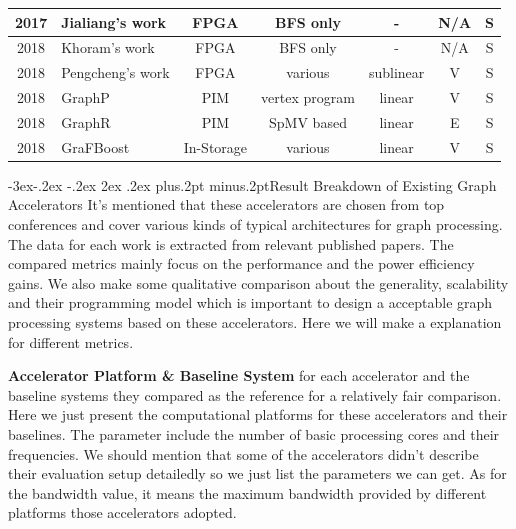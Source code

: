 \documentclass[twoside]{article}
\makeatletter
\def\subsection{\@startsection{subsection}{2}{\z@}%
 {-3ex\@plus -.2ex \@minus -.2ex}%
 {2ex \@plus.2ex}%
{\normalfont\normalsize\protect\baselineskip=12.5pt plus.2pt minus.2pt\bfseries}}
\makeatother
\begin{document}
\begin{multicols}{2}
\begin{table}[]
{\begin{tabular}{|c|l|c|c|c|c|c|}
2017          & Jialiang's work \cite{Zhang2017fpgahmcbfs}  & FPGA                  & BFS only                   & -                    & N/A                        & S                     \\ \hline
2018          & Khoram's work \cite{Khoram2018fpgaco-optimizinghmc} & FPGA                  & BFS only                   & -                    & N/A                        & S                     \\ \hline
2018          & Pengcheng's work \cite{yao2018pact}  & FPGA                  & various                    & sublinear            & V                          & S                     \\ \hline
2018          & GraphP \cite{zhang2018graphp}        & PIM                   & vertex program             & linear               & V                          & S                     \\ \hline
2018          & GraphR \cite{song2018graphr}         & PIM                   & SpMV based                 & linear               & E                          & S                     \\ \hline
2018          & GraFBoost \cite{JUN2018GRAFBOOST}    & In-Storage            & various                    & linear               & V                          & S                     \\ \hline
\end{tabular}%
}
\end{table}

\subsection{Result Breakdown of Existing Graph Accelerators}
It's mentioned that these accelerators are chosen from top conferences and cover various kinds of typical architectures for graph processing. The data for each work is extracted from relevant published papers. The compared metrics mainly focus on the performance and the power efficiency gains. We also make some qualitative comparison about the generality, scalability and their programming model which is important to design a acceptable graph processing systems based on these accelerators. Here we will make a explanation for different metrics. 

{\bf Accelerator Platform \& Baseline System} for each accelerator and the baseline systems they compared as the reference for a relatively fair comparison. Here we just present the computational platforms for these accelerators and their baselines. The parameter include the number of basic processing cores and their frequencies. We should mention that some of the accelerators didn't describe their evaluation setup detailedly so we just list the parameters we can get. As for the bandwidth value, it means the maximum bandwidth provided by different platforms those accelerators adopted. 


\end{multicols}
\end{document}
